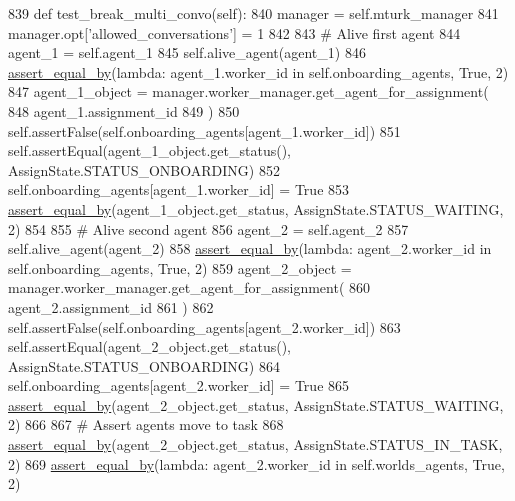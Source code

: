 \begin{DoxyCode}
839     \textcolor{keyword}{def }test\_break\_multi\_convo(self):
840         manager = self.mturk\_manager
841         manager.opt[\textcolor{stringliteral}{'allowed\_conversations'}] = 1
842 
843         \textcolor{comment}{# Alive first agent}
844         agent\_1 = self.agent\_1
845         self.alive\_agent(agent\_1)
846         \hyperlink{namespaceparlai_1_1mturk_1_1core_1_1test_1_1test__full__system_a0b463246d35658a2e422010f13dcf819}{assert\_equal\_by}(\textcolor{keyword}{lambda}: agent\_1.worker\_id \textcolor{keywordflow}{in} self.onboarding\_agents, \textcolor{keyword}{True}, 2)
847         agent\_1\_object = manager.worker\_manager.get\_agent\_for\_assignment(
848             agent\_1.assignment\_id
849         )
850         self.assertFalse(self.onboarding\_agents[agent\_1.worker\_id])
851         self.assertEqual(agent\_1\_object.get\_status(), AssignState.STATUS\_ONBOARDING)
852         self.onboarding\_agents[agent\_1.worker\_id] = \textcolor{keyword}{True}
853         \hyperlink{namespaceparlai_1_1mturk_1_1core_1_1test_1_1test__full__system_a0b463246d35658a2e422010f13dcf819}{assert\_equal\_by}(agent\_1\_object.get\_status, AssignState.STATUS\_WAITING, 2)
854 
855         \textcolor{comment}{# Alive second agent}
856         agent\_2 = self.agent\_2
857         self.alive\_agent(agent\_2)
858         \hyperlink{namespaceparlai_1_1mturk_1_1core_1_1test_1_1test__full__system_a0b463246d35658a2e422010f13dcf819}{assert\_equal\_by}(\textcolor{keyword}{lambda}: agent\_2.worker\_id \textcolor{keywordflow}{in} self.onboarding\_agents, \textcolor{keyword}{True}, 2)
859         agent\_2\_object = manager.worker\_manager.get\_agent\_for\_assignment(
860             agent\_2.assignment\_id
861         )
862         self.assertFalse(self.onboarding\_agents[agent\_2.worker\_id])
863         self.assertEqual(agent\_2\_object.get\_status(), AssignState.STATUS\_ONBOARDING)
864         self.onboarding\_agents[agent\_2.worker\_id] = \textcolor{keyword}{True}
865         \hyperlink{namespaceparlai_1_1mturk_1_1core_1_1test_1_1test__full__system_a0b463246d35658a2e422010f13dcf819}{assert\_equal\_by}(agent\_2\_object.get\_status, AssignState.STATUS\_WAITING, 2)
866 
867         \textcolor{comment}{# Assert agents move to task}
868         \hyperlink{namespaceparlai_1_1mturk_1_1core_1_1test_1_1test__full__system_a0b463246d35658a2e422010f13dcf819}{assert\_equal\_by}(agent\_2\_object.get\_status, AssignState.STATUS\_IN\_TASK, 2)
869         \hyperlink{namespaceparlai_1_1mturk_1_1core_1_1test_1_1test__full__system_a0b463246d35658a2e422010f13dcf819}{assert\_equal\_by}(\textcolor{keyword}{lambda}: agent\_2.worker\_id \textcolor{keywordflow}{in} self.worlds\_agents, \textcolor{keyword}{True}, 2)

\end{DoxyCode}
